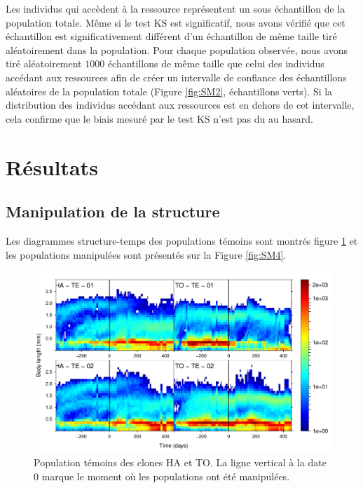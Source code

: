 Les individus qui accèdent à la ressource représentent un sous échantillon de la
population totale. Même si le test KS est significatif, nous avons vérifié que
cet échantillon est significativement différent d'un échantillon de même taille
tiré aléatoirement dans la population. Pour chaque population observée, nous
avons tiré aléatoirement $1000$ échantillons de même taille que celui des
individus accédant aux ressources afin de créer un intervalle de confiance des
échantillons aléatoires de la population totale (Figure \ref{fig:SM2},
échantillons verts). Si la distribution des individus accédant aux ressources
est en dehors de cet intervalle, cela confirme que le biais mesuré par le test KS
n'est pas du au hasard.

\section{Résultats}

\subsection{Manipulation de la structure}

Les diagrammes structure-temps des populations témoins sont montrés figure
\ref{fig:SM3} et les populations manipulées sont présentés sur la Figure
\ref{fig:SM4}.

\begin{figure}[!ht]
\begin{center}
\includegraphics[width=1\textwidth]{1_CorpsDeThese/Resumes/Fig/SM04}
\caption[Population
témoins des clones HA et TO]{Population
témoins des clones HA et TO. La ligne vertical à la date 0 marque le moment où
les populations ont été manipulées.}
\label{fig:SM3}
\end{center}
\end{figure}

